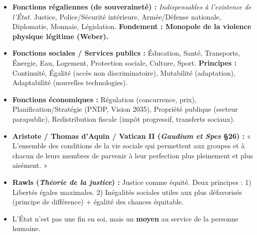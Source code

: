 \documentclass[11pt]{article}
\begin{document}
\begin{definition}
\begin{itemize}
    \item \textbf{Fonctions régaliennes (de souveraineté) :} \emph{Indispensables à l'existence de l'État.} Justice, Police/Sécurité intérieure, Armée/Défense nationale, Diplomatie, Monnaie, Législation. \textbf{Fondement : Monopole de la violence physique légitime (Weber).}
    \item \textbf{Fonctions sociales / Services publics :} Éducation, Santé, Transports, Énergie, Eau, Logement, Protection sociale, Culture, Sport. \textbf{Principes :} Continuité, Égalité (accès non discriminatoire), Mutabilité (adaptation), Adaptabilité (nouvelles technologies).
    \item \textbf{Fonctions économiques :} Régulation (concurrence, prix), Planification/Stratégie (PNDP, Vision 2035), Propriété publique (secteur parapublic), Redistribution fiscale (impôt progressif, transferts sociaux).
\end{itemize}
\end{definition}

\begin{aretenir}
\begin{itemize}
    \item \textbf{Aristote / Thomas d'Aquin / Vatican II (\emph{Gaudium et Spes} §26) :} « L'ensemble des conditions de la vie sociale qui permettent aux groupes et à chacun de leurs membres de parvenir à leur perfection plus pleinement et plus aisément. »
    \item \textbf{Rawls (\emph{Théorie de la justice}) :} Justice comme équité. Deux principes : 1) Libertés égales maximales. 2) Inégalités sociales utiles aux plus défavorisés (principe de différence) + égalité des chances équitable.
    \item L'État n'est pas une fin en soi, mais un \textbf{moyen} au service de la personne humaine.
\end{itemize}
\end{aretenir}
\end{document}
